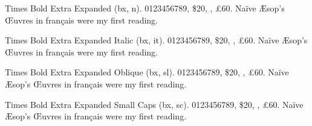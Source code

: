 \documentclass{article}
\begin{document}
{\selectfont

Times Bold Extra Expanded (bx, n).  0123456789, \$20, , \pounds60.
Na\"ive \AE sop's \OE uvres in fran\c cais were my first reading.
\lipsum[14] 

{\selectfont
Times Bold Extra Expanded Italic (bx, it).  0123456789, \$20, , \pounds60.
Na\"ive \AE sop's \OE uvres in fran\c cais were my first reading.
\lipsum[15]}

{\selectfont
Times Bold Extra Expanded Oblique (bx, sl).  0123456789, \$20, , \pounds60.
Na\"ive \AE sop's \OE uvres in fran\c cais were my first reading.
\lipsum[16]}

{\selectfont
Times Bold Extra Expanded Small Caps (bx, sc).  0123456789, \$20,
, \pounds60. 
Na\"ive \AE sop's \OE uvres in fran\c cais were my first reading.
\lipsum[17]}
}
\end{document}
